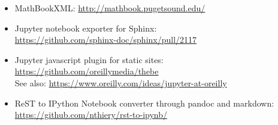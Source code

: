 \begin{itemize}
\tightlist
\item
  MathBookXML: \url{http://mathbook.pugetsound.edu/}
\item
  Jupyter notebook exporter for Sphinx:\\
  \url{https://github.com/sphinx-doc/sphinx/pull/2117}
\item
  Jupyter javascript plugin for static sites:\\
  \url{https://github.com/oreillymedia/thebe}\\
  See also: \url{https://www.oreilly.com/ideas/jupyter-at-oreilly}
\item
  ReST to IPython Notebook converter through pandoc and markdown:\\
  \url{https://github.com/nthiery/rst-to-ipynb/}
\end{itemize}
